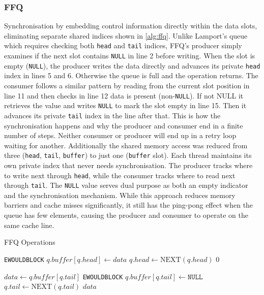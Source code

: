 \subsubsection{\acf{FFQ}}
Synchronisation by embedding control information directly within the data slots, eliminating separate shared indices shown in \cref{alg:ffq}. Unlike Lamport's queue which requires checking both \texttt{head} and \texttt{tail} indices, \ac{FFQ}'s producer simply examines if the next slot contains \texttt{NULL} in line 2 before writing. When the slot is empty (\texttt{NULL}), the producer writes the data directly and advances its private \texttt{head} index in lines 5 and 6. Otherwise the queue is full and the operation returns. The consumer follows a similar pattern by reading from the current slot position in line 11 and then checks in line 12 data is present (non-\texttt{NULL}). If not NULL it retrieves the value and writes \texttt{NULL} to mark the slot empty in line 15. Then it advances its private \texttt{tail} index in the line after that. This is how the synchronisation happens and why the producer and consumer end in a finite number of steps. Neither consumer or producer will end up in a retry loop waiting for another. Additionally the shared memory access was reduced from three (\texttt{head}, \texttt{tail}, \texttt{buffer}) to just one (\texttt{buffer} slot). Each thread maintains its own private index that never needs synchronisation. The producer tracks where to write next through \texttt{head}, while the consumer tracks where to read next through \texttt{tail}. The \texttt{NULL} value serves dual purpose as both an empty indicator and the synchronisation mechanism. While this approach reduces memory barriers and cache misses significantly, it still has the ping-pong effect when the queue has few elements, causing the producer and consumer to operate on the same cache line. \cite{ffq} 

\begin{algorithm}[!ht]
    \centering
    \captionsetup{justification=centering}
    \caption{\ac{FFQ} Operations \cite{ffq}}
    \label{alg:ffq}
    \scriptsize
    \begin{algorithmic}[1]
                \State \Return \texttt{EWOULDBLOCK}
            \EndIf
            \State $q.buffer[q.head] \gets data$
            \State $q.head \gets \text{NEXT}(q.head)$
            \State \Return $0$
        \EndFunction
        
        \State
        
            \State $data \gets q.buffer[q.tail]$
                \State \Return \texttt{EWOULDBLOCK}
            \EndIf
            \State $q.buffer[q.tail] \gets \texttt{NULL}$
            \State $q.tail \gets \text{NEXT}(q.tail)$
            \State \Return $data$
        \EndFunction
    \end{algorithmic}
\end{algorithm}

